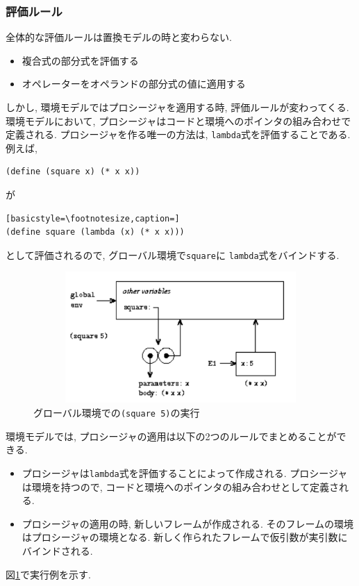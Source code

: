 \subsubsection{評価ルール}
全体的な評価ルールは置換モデルの時と変わらない.

\begin{itemize}
\item 複合式の部分式を評価する
\item オペレーターをオペランドの部分式の値に適用する
\end{itemize}

しかし, 環境モデルではプロシージャを適用する時, 評価ルールが変わってくる.
環境モデルにおいて, プロシージャはコードと環境へのポインタの組み合わせで定義される.
プロシージャを作る唯一の方法は, \lstinline{lambda}式を評価することである.
例えば,

\begin{lstlisting}[basicstyle=\footnotesize]
(define (square x) (* x x))
\end{lstlisting}
が
\begin{lstlisting}[basicstyle=\footnotesize,caption=]
(define square (lambda (x) (* x x)))
\end{lstlisting}
として評価されるので, グローバル環境で\lstinline{square}に
\lstinline{lambda}式をバインドする.

\begin{figure}[h]
  \centering
  \includegraphics[height=5cm,width=12cm]{imgs/square_env.png}
  \caption{\label{fig:square-env}グローバル環境での\lstinline{(square 5)}の実行}
\end{figure}


環境モデルでは, プロシージャの適用は以下の2つのルールでまとめることができる.
\begin{itemize}
\item プロシージャは\lstinline{lambda}式を評価することによって作成される.
  プロシージャは環境を持つので, コードと環境へのポインタの組み合わせとして定義される.
\item プロシージャの適用の時, 新しいフレームが作成される.
  そのフレームの環境はプロシージャの環境となる.
  新しく作られたフレームで仮引数が実引数にバインドされる.
\end{itemize}

図\ref{fig:square-env}で実行例を示す.